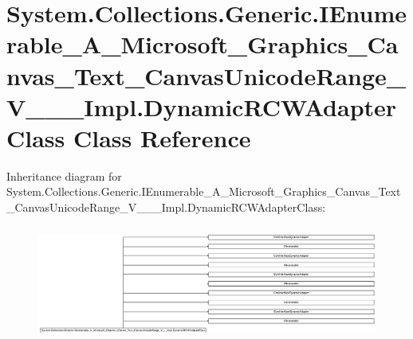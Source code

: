 \hypertarget{class_system_1_1_collections_1_1_generic_1_1_i_enumerable___a___microsoft___graphics___canvas___d6330432efec18befada6e055203d40b}{}\section{System.\+Collections.\+Generic.\+I\+Enumerable\+\_\+\+A\+\_\+\+Microsoft\+\_\+\+Graphics\+\_\+\+Canvas\+\_\+\+Text\+\_\+\+Canvas\+Unicode\+Range\+\_\+\+V\+\_\+\+\_\+\+\_\+\+Impl.\+Dynamic\+R\+C\+W\+Adapter\+Class Class Reference}
\label{class_system_1_1_collections_1_1_generic_1_1_i_enumerable___a___microsoft___graphics___canvas___d6330432efec18befada6e055203d40b}
Inheritance diagram for System.\+Collections.\+Generic.\+I\+Enumerable\+\_\+\+A\+\_\+\+Microsoft\+\_\+\+Graphics\+\_\+\+Canvas\+\_\+\+Text\+\_\+\+Canvas\+Unicode\+Range\+\_\+\+V\+\_\+\+\_\+\+\_\+\+Impl.\+Dynamic\+R\+C\+W\+Adapter\+Class\+:\begin{figure}[H]
\begin{center}
\leavevmode
\includegraphics[height=3.797781cm]{class_system_1_1_collections_1_1_generic_1_1_i_enumerable___a___microsoft___graphics___canvas___d6330432efec18befada6e055203d40b}
\end{center}
\end{figure}

